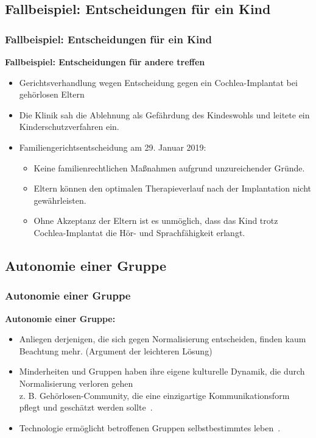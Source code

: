 \documentclass[aspectratio=169,16pt,xcolor=table]{beamer}
\begin{document}
\subsection*{Fallbeispiel: Entscheidungen für ein Kind}
\begin{frame}
  \frametitle{Fallbeispiel: Entscheidungen für ein Kind}
  \textbf{Fallbeispiel: Entscheidungen für andere treffen}
  \begin{itemize}
    \item Gerichtsverhandlung wegen Entscheidung gegen ein Cochlea-Implantat bei gehörlosen Eltern~\cite{brde}
    \item Die Klinik sah die Ablehnung als Gefährdung des Kindeswohls und leitete ein Kinderschutzverfahren ein.
    \item Familiengerichtsentscheidung am 29. Januar 2019:
    \begin{itemize}
      \item Keine familienrechtlichen Maßnahmen aufgrund unzureichender Gründe.
      \item Eltern können den optimalen Therapieverlauf nach der Implantation nicht gewährleisten.
      \item Ohne Akzeptanz der Eltern ist es unmöglich, dass das Kind trotz Cochlea-Implantat die Hör- und Sprachfähigkeit erlangt.~\cite{brde}
    \end{itemize}
  \end{itemize}
\end{frame}

\subsection*{Autonomie einer Gruppe}
\begin{frame}
  \frametitle{Autonomie einer Gruppe}
  \textbf{Autonomie einer Gruppe:}
  \begin{itemize}
    \item Anliegen derjenigen, die sich gegen Normalisierung entscheiden, finden kaum Beachtung mehr. (Argument der leichteren Lösung)
    \item Minderheiten und Gruppen haben ihre eigene kulturelle Dynamik, die durch Normalisierung verloren gehen\\z. B. Gehörlosen-Community, die eine einzigartige Kommunikationsform pflegt und geschätzt werden sollte~\cite{lee2016cochlear}.
    \item Technologie ermöglicht betroffenen Gruppen selbstbestimmtes leben~\cite{das2022locked}.
  \end{itemize}
\end{frame}
\end{document}
